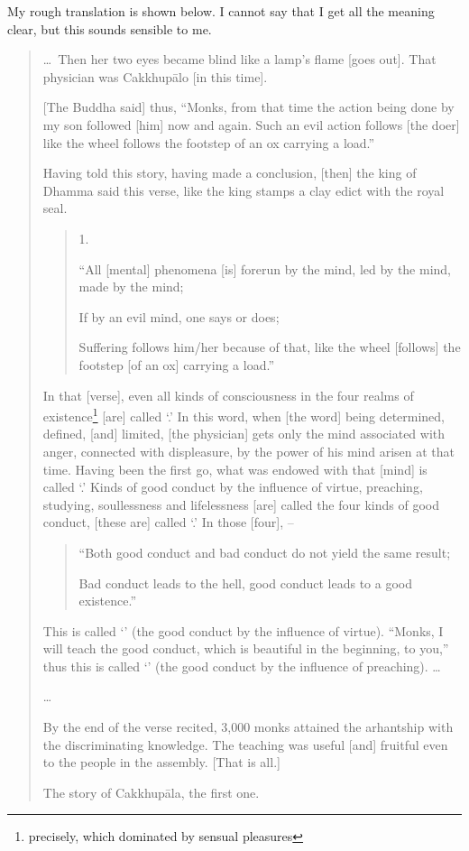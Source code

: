 My rough translation is shown below. I cannot say that I get all the meaning clear, but this sounds sensible to me.

\begin{quotation}
\ldots\ Then her two eyes became blind like a lamp's flame [goes out]. That physician was Cakkhup\=alo [in this time].

{[The Buddha said]} thus, ``Monks, from that time the action being done by my son followed [him] now and again. Such an evil action follows [the doer] like the wheel follows the footstep of an ox carrying a load.''

Having told this story, having made a conclusion, [then] the king of Dhamma said this verse, like the king stamps a clay edict with the royal seal.

\begin{quote}
1.\par
``All [mental] phenomena [is] forerun by the mind, led by the mind, made by the mind;\par
If by an evil mind, one says or does;\par
Suffering follows him/her because of that, like the wheel [follows] the footstep [of an ox] carrying a load.''
\end{quote}

In that [verse], even all kinds of consciousness in the four realms of existence\footnote{precisely, which dominated by sensual pleasures} [are] called `.' In this word, when [the word] being determined, defined, [and] limited, [the physician] gets only the mind associated with anger, connected with displeasure, by the power of his mind arisen at that time. Having been the first go, what was endowed with that [mind] is called `.' Kinds of good conduct by the influence of virtue, preaching, studying, soullessness and lifelessness [are] called the four kinds of good conduct, [these are] called `.' In those [four], --

\begin{quote}
``Both good conduct and bad conduct do not yield the same result;\par
Bad conduct leads to the hell, good conduct leads to a good existence.''
\end{quote}

This is called `' (the good conduct by the influence of virtue). ``Monks, I will teach the good conduct, which is beautiful in the beginning, to you,'' thus this is called `' (the good conduct by the influence of preaching). \ldots

\ldots

By the end of the verse recited, 3,000 monks attained the arhantship with the discriminating knowledge. The teaching was useful [and] fruitful even to the people in the assembly. [That is all.]

The story of Cakkhup\=ala, the first one.
\end{quotation}

